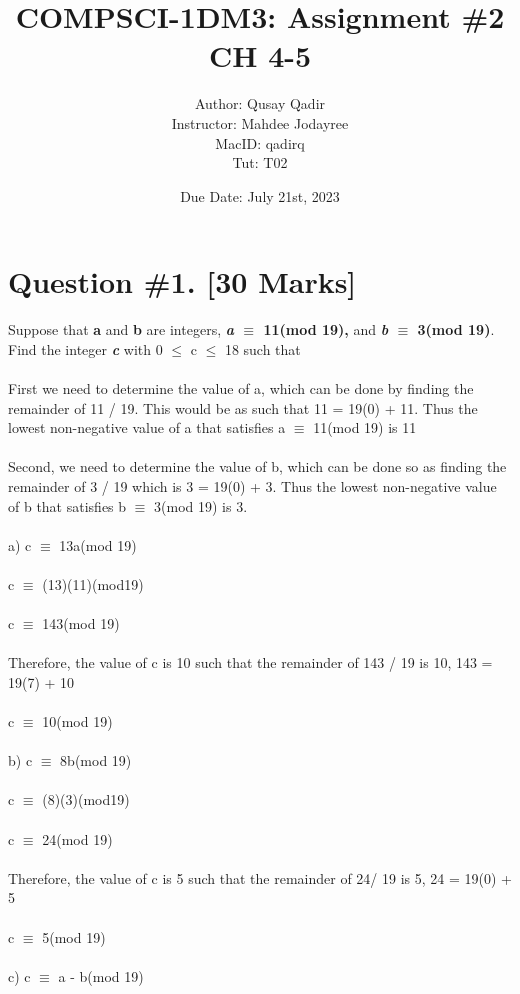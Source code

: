 \documentclass{article}
\title{
\LARGE COMPSCI-1DM3: Assignment \#2 CH 4-5 \\
}
\author{\Large Author: Qusay Qadir \\
\large Instructor: Mahdee Jodayree \\ MacID: qadirq \\Tut: T02 \\ }
\date{Due Date: July 21st, 2023}
\begin{document}
\maketitle
\newpage
\tableofcontents
\newpage

\section{Question \#1. [30 Marks]}
Suppose that \textbf{a} and \textbf{b} are integers, \textbf{\emph{a}  $\equiv$ 11(mod 19),}  and \textbf{\emph{b }$\equiv$ 3(mod 19)}. Find the integer \textbf{\emph{c}} with 0 $\leq$ c $\leq$ 18 such that \\\\
First we need to determine the value of a, which can be done by finding the remainder of 11 / 19. This would be as such that 
11 = 19(0) + 11. Thus the lowest non-negative value of a that satisfies a $\equiv$ 11(mod 19) is 11 \\\\
Second, we need to determine the value of b, which can be done so as finding the remainder of 3 / 19 which is 3 = 19(0) + 3. Thus the lowest non-negative value of b that satisfies b $\equiv$ 3(mod 19) is 3.\\\\
a) c $\equiv$ 13a(mod 19) \\  \\
c $\equiv$ (13)(11)(mod19)\\\\
c $\equiv$ 143(mod 19) \\\\
Therefore, the value of c is 10 such that the remainder of 143 / 19 is 10,  143 = 19(7) + 10 \\\\
c $\equiv$ 10(mod 19) \\\\
b) c $\equiv$ 8b(mod 19) \\\\
c $\equiv$ (8)(3)(mod19)\\\\
c $\equiv$ 24(mod 19) \\\\
Therefore, the value of c is 5 such that the remainder of 24/ 19 is 5,  24 = 19(0) + 5  \\\\
c $\equiv$ 5(mod 19) \\\\
c) c $\equiv$ a - b(mod 19) \\\\
\end{document}
